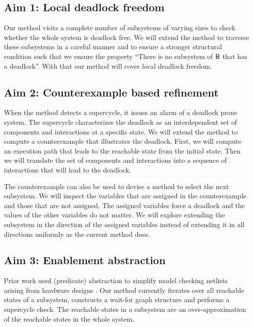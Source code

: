 \subsection{Aim 1: Local deadlock freedom} 

Our method visits a complete number of 
subsystems of varying sizes to check whether
the whole system is deadlock free. 
We will extend the method to traverse these subsystems
in a careful manner and to ensure a stronger structural 
condition such that we ensure the property 
``There is no subsystem of $\mathsf{B}$ that has a deadlock''. 
With that our method will cover local deadlock freedom. 

\subsection{Aim 2: Counterexample based refinement} 

When the method detects a supercycle, it issues an alarm of a 
deadlock prone system. 
The supercycle characterizes the deadlock as an interdependent 
set of components and interactions
at a specific state. 
We will extend the method to compute a counterexample
that illustrates the deadlock. 
First, we will compute an execution path that leads 
to the reachable state from the initial state. 
Then we will translate the set of components and interactions
into a sequence of interactions that will lead to the deadlock. 

The counterexample can also be used to devise a method to
select the next subsystem. 
We will inspect the variables that are assigned
in the counterexample and those that are not assigned. 
The assigned variables force a deadlock and the values of the
other variables do not matter. 
We will explore extending the subsystem in the direction of 
the assigned 
variables instead of extending it in all directions uniformly 
as the current method does. 

\subsection{Aim 3: Enablement abstraction } 

Prior work used (predicate) abstraction to simplify model checking
netlists arising from hardware designs \cite{BaumgartnerM05Charme,BaumgartnerK04Date,BaumgartnerKA02CAV}.
Our method currently iterates over all reachable states of
a subsystem, constructs a wait-for graph structure and 
performs a supercycle check. 
The reachable states in a subsystem are an over-approximation
of the reachable states in the whole system. 

